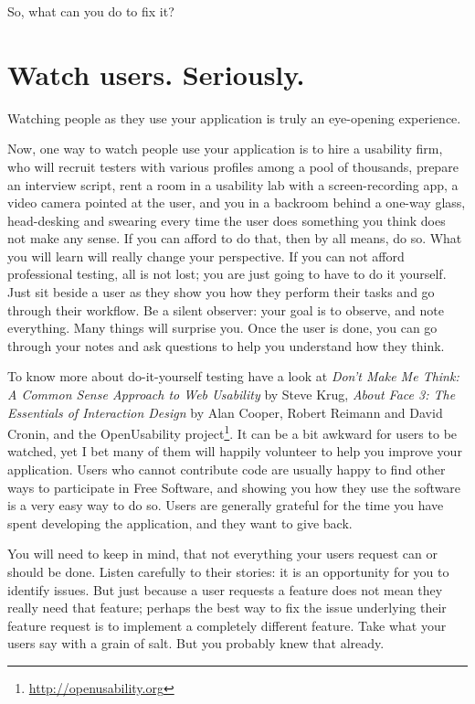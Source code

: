 So, what can you do to fix it?

\section*{Watch users. Seriously.}

Watching people as they use your application is truly an eye-opening experience.

Now, one way to watch people use your application is to hire a usability firm,
who will recruit testers with various profiles among a pool of thousands,
prepare an interview script, rent a room in a usability lab with a
screen-recording app, a video camera pointed at the user, and you in a
backroom behind a one-way glass, head-desking and swearing every time the user
does something you think does not make any sense. If you can afford to do that,
then by all means, do so. What you will learn will really change your
perspective. If you can not afford professional testing, all is not lost; you
are just going to have to do it yourself. Just sit beside a user as they show
you how they perform their tasks and go through their workflow. Be a silent
observer: your goal is to observe, and note everything. Many things will
surprise you. Once the user is done, you can go through your notes and ask
questions to help you understand how they think.

To know more about
do-it-yourself testing have a look at \textit{Don't Make Me Think: A Common
Sense Approach to Web Usability} by Steve Krug, \textit{About Face 3: The
Essentials of Interaction Design} by Alan Cooper, Robert Reimann and David
Cronin, and the OpenUsability project\footnote{\url{http://openusability.org}}.
It can be a bit awkward for users to be watched, yet I bet many of them will
happily volunteer to help you improve your application. Users who cannot
contribute code are usually happy to find other ways to participate in Free Software, and showing
you how they use the software is a very easy way to do so. Users are generally
grateful for the time you have spent developing the application, and they want
to give back.

You will need to keep in mind, that not everything your users request
can or should be done. Listen carefully to their stories: it is an opportunity
for you to identify issues. But just because a user requests a feature does not mean
they really need that feature; perhaps the best way to fix the issue underlying
their feature request is to implement a completely different feature. Take what
your users say with a grain of salt. But you probably knew that already. 

